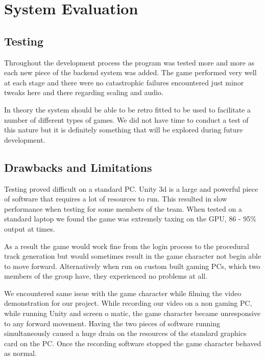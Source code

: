 
\chapter{System Evaluation}
\section{Testing}
Throughout the development process the program was tested more and more as each new piece of the backend system was added. The game performed very well at each stage and there were no catastrophic failures encountered just minor tweaks here and there regarding scaling and audio.
\newline

In theory the system should be able to be retro fitted to be used to facilitate a number of different types of games. We did not have time to conduct a test of this nature but it is definitely something that will be explored during future development.
\newline

\section{Drawbacks and Limitations}
Testing proved difficult on a standard PC. Unity 3d is a large and powerful piece of software that requires a lot of resources to run. This resulted in slow performance when testing for some members of the team. When tested on a standard laptop we found the game was extremely taxing on the GPU, 86 - 95\% output at times.
\newline

As a result the game would work fine from the login process to the procedural track generation but would sometimes result in the game character not begin able to move forward. Alternatively when run on custom built gaming PCs, which two members of the group have, they experienced no problems at all.
\newline

We encountered same issue with the game character while filming the video demonstration for our project. While recording our video on a non gaming PC, while running Unity and screen o matic, the game character became unresponsive to any forward movement. Having the two pieces of software running simultaneously caused a huge drain on the resources of the standard graphics card on the PC. Once the recording software stopped the game character behaved as normal.
\newline

